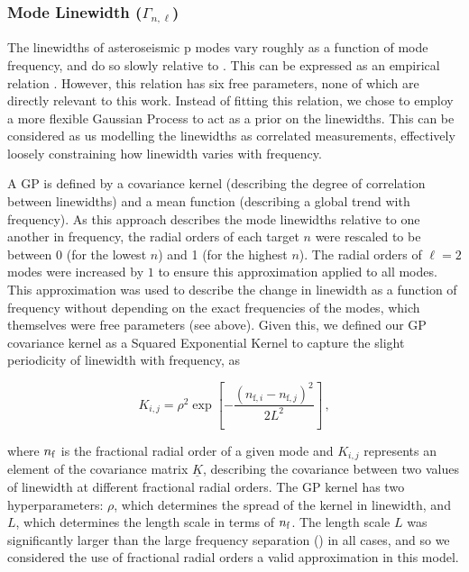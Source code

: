 \subsubsection{Mode Linewidth ($\Gamma_{n,\ell}$)}
The linewidths of asteroseismic p modes vary roughly as a function of mode frequency, and do so slowly relative to \dnu. This can be expressed as an empirical relation \cite{lund+2017, davies+2014, appourchaux+2016}. However, this relation has six free parameters, none of which are directly relevant to this work. Instead of fitting this relation, we chose to employ a more flexible Gaussian Process \cite[GP]{rasmussen+williams2006} to act as a prior on the linewidths. This can be considered as us modelling the linewidths as correlated measurements, effectively loosely constraining how linewidth varies with frequency.

A GP is defined by a covariance kernel (describing the degree of correlation between linewidths) and a mean function (describing a global trend with frequency). As this approach describes the mode linewidths relative to one another in frequency, the radial orders of each target $n$ were rescaled to be between 0 (for the lowest $n$) and 1 (for the highest $n$). The radial orders of $\ell = 2$ modes were increased by $1$ to ensure this approximation applied to all modes. This approximation was used to describe the change in linewidth as a function of frequency without depending on the exact frequencies of the modes, which themselves were free parameters (see above). Given this, we defined our GP covariance kernel as a Squared Exponential Kernel to capture the slight periodicity of linewidth with frequency, as

\begin{equation}\label{eq:gpkernel}
	K_{i,j} = \rho^2 \exp \left[ -\frac{(n_{\textrm{f}, i} - n_{\textrm{f}, j})^2}{2L^2} \right]\, ,
\end{equation}

\noindent where $n_{\rm f}$ is the fractional radial order of a given mode and  $K_{i,j}$ represents an element of the covariance matrix $\underline{K}$, describing the covariance between two values of linewidth at different fractional radial orders. The GP kernel has two hyperparameters: $\rho$, which determines the spread of the kernel in linewidth, and $L$, which determines the length scale in terms of $n_{\rm f}$. The length scale $L$ was significantly larger than the large frequency separation (\dnu) in all cases, and so we considered the use of fractional radial orders a valid approximation in this model.

